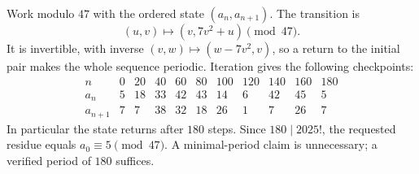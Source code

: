 Work modulo $47$ with the ordered state $(a_n,a_{n+1})$. The transition is
\[
(u,v)\longmapsto(v,7v^2+u)\pmod{47}.
\]
It is invertible, with inverse $(v,w)\mapsto(w-7v^2,v)$, so a return to the initial pair makes the whole sequence periodic. Iteration gives the following checkpoints:
\[
\begin{array}{c|rrrrrrrrrr}
n&0&20&40&60&80&100&120&140&160&180\\\hline
a_n&5&18&33&42&43&14&6&42&45&5\\
a_{n+1}&7&7&38&32&18&26&1&7&26&7
\end{array}
\]
In particular the state returns after $180$ steps. Since $180\mid2025!$, the requested residue equals $a_0\equiv\boxed5\pmod{47}$. A minimal-period claim is unnecessary; a verified period of $180$ suffices.
